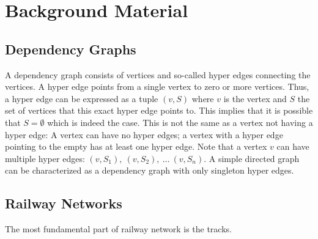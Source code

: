 \chapter{Background Material} %
\label{chpt:background-material}

\section{Dependency Graphs} %
\label{sec:dependency-graphs}

A dependency graph consists of vertices and so-called hyper edges connecting the
vertices. A hyper edge points from a single vertex to zero or more vertices.
Thus, a hyper edge can be expressed as a tuple $(v, S)$ where $v$ is the vertex
and $S$ the set of vertices that this exact hyper edge points to. This implies
that it is possible that $S = \emptyset$ which is indeed the case. This is not
the same as a vertex not having a hyper edge: A vertex can have no hyper edges;
a vertex with a hyper edge pointing to the empty has at least one hyper edge.
Note that a vertex $v$ can have multiple hyper edges: $(v, S_1),\ (v, S_2),\
\ldots\ (v,S_n)$. A simple directed graph can be characterized as a dependency
graph with only singleton hyper edges. 


\section{Railway Networks} %
\label{sec:railway-networks}

The most fundamental part of railway network is the tracks. 


